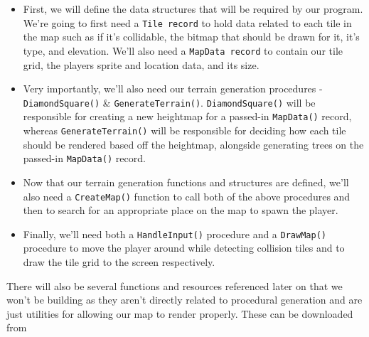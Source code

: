 \documentclass{article}
\begin{document}
\begin{itemize}
\item
	First, we will define the data structures that will be required by our program. We're going to first need a \texttt{Tile record} to hold data related to each tile in the map such as if it's 		collidable, the bitmap that should be drawn for it, it's type, and elevation. We'll also need a \texttt{MapData record} to contain our tile grid, the players sprite and location data, and 	its size.
\item
	Very importantly, we'll also need our terrain generation procedures - \texttt{DiamondSquare()} \& \texttt{GenerateTerrain()}. \texttt{DiamondSquare()} will be 	responsible for creating a new heightmap for a passed-in \texttt{MapData()} record, whereas \texttt{GenerateTerrain()} will be responsible for deciding how each tile 		should be rendered based off the heightmap, alongside generating trees on the passed-in \texttt{MapData()} record.
\item
	Now that our terrain generation functions and structures are defined, we'll also need a \texttt{CreateMap()} function to call both of the above procedures and then to search for an 	appropriate place on the map to spawn the player.
\item
	Finally, we'll need both a \texttt{HandleInput()} procedure and a \texttt{DrawMap()} procedure to move the player around while detecting collision tiles and to draw the 	tile grid to the screen respectively.
\end{itemize}

There will also be several functions and resources referenced later on that we won't be building as they aren't directly related to procedural generation and are just utilities for allowing our map to render properly. These can be downloaded from 

	
	
\printbibliography
	
\end{document}
